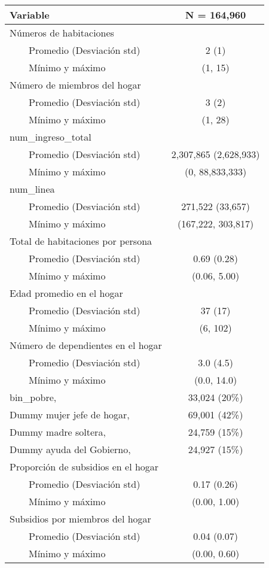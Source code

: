\begin{longtable}{lc}
\toprule
\textbf{Variable} & \textbf{N = 164,960} \\ 
\midrule
Números de habitaciones &  \\ 
    Promedio (Desviación std) & 2 (1) \\ 
    Mínimo y máximo & (1, 15) \\ 
Número de miembros del hogar &  \\ 
    Promedio (Desviación std) & 3 (2) \\ 
    Mínimo y máximo & (1, 28) \\ 
num_ingreso_total &  \\ 
    Promedio (Desviación std) & 2,307,865 (2,628,933) \\ 
    Mínimo y máximo & (0, 88,833,333) \\ 
num_linea &  \\ 
    Promedio (Desviación std) & 271,522 (33,657) \\ 
    Mínimo y máximo & (167,222, 303,817) \\ 
Total de habitaciones por persona &  \\ 
    Promedio (Desviación std) & 0.69 (0.28) \\ 
    Mínimo y máximo & (0.06, 5.00) \\ 
Edad promedio en el hogar &  \\ 
    Promedio (Desviación std) & 37 (17) \\ 
    Mínimo y máximo & (6, 102) \\ 
Número de dependientes en el hogar &  \\ 
    Promedio (Desviación std) & 3.0 (4.5) \\ 
    Mínimo y máximo & (0.0, 14.0) \\ 
bin_pobre,  & 33,024  (20\%) \\ 
Dummy mujer jefe de hogar,  & 69,001  (42\%) \\ 
Dummy madre soltera,  & 24,759  (15\%) \\ 
Dummy ayuda del Gobierno,  & 24,927  (15\%) \\ 
Proporción de subsidios en el hogar &  \\ 
    Promedio (Desviación std) & 0.17 (0.26) \\ 
    Mínimo y máximo & (0.00, 1.00) \\ 
Subsidios por miembros del hogar &  \\ 
    Promedio (Desviación std) & 0.04 (0.07) \\ 
    Mínimo y máximo & (0.00, 0.60) \\ 

\end{longtable}
